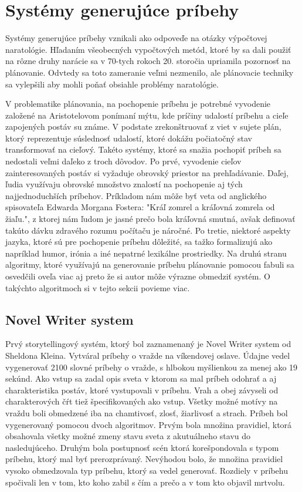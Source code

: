 \section{Systémy generujúce príbehy}
Systémy generujúce príbehy vznikali ako odpoveďe na otázky výpočtovej naratológie. Hľadaním všeobecných vypočtových metód, ktoré by sa dali použiť na rôzne druhy narácie sa v 70-tych rokoch 20. storočia upriamila pozornosť na plánovanie. Odvtedy sa toto zameranie veľmi nezmenilo, ale plánovacie techniky sa vylepšili aby mohli poňať obsiahle problémy naratológie.\par
V problematike plánovania, na pochopenie príbehu je potrebné vyvodenie založené na Aristotelovom ponímaní mýtu, kde príčiny udalostí príbehu a cieľe zapojených postáv su známe. V podstate zrekonštruovať z viet v sujete plán, ktorý reprezentuje súslednosť udalostí, ktoré dokážu počiatočný stav transformovať na cieľový. Takéto systémy, ktoré sa snažia pochopiť príbeh sa nedostali veľmi daľeko z troch dôvodov. Po prvé, vyvodenie cieľov zainteresovaných postáv si vyžaduje obrovský priestor na prehľadávanie. Daľej, ľudia využívaju obrovské množstvo znalostí na pochopenie aj tých najjednoduchších príbehov. Príkladom nám môže byť veta od anglického spisovateľa Edwarda Morgana Fostera: "Kráľ zomrel a kráľovná zomrela od žiaľu.", z ktorej nám ľudom je jasné prečo bola kráľovná smutná, avšak definovať takúto dávku zdravého rozumu počítaču je náročné. Po tretie, niektoré aspekty jazyka, ktoré sú pre pochopenie príbehu dôležité, sa tažko formalizujú ako napríklad humor, irónia a iné nepatrné lexikálne prostriedky. Na druhú stranu algoritmy, ktoré využívajú na generovanie príbehu plánovanie pomocou fabuli sa osvedčili oveľa viac aj preto že si autor môže výrazne obmedziť systém. O takýchto algoritmoch si v tejto sekcii povieme viac.\par
\subsection{Novel Writer system}
Prvý storytellingový systém, ktorý bol zaznamenaný je Novel Writer system\cite{novel_writer} od Sheldona Kleina. Vytváral príbehy o vražde na víkendovej oslave. Údajne vedel vygenerovať 2100 slovné príbehy o vražde, s hlbokou myšlienkou za menej ako 19 sekúnd. Ako vstup sa zadal opis sveta v ktorom sa mal príbeh odohrať a aj charakteristika postáv, ktoré vystupovali v príbehu. Vrah a obej závyseli od charakterových čŕt tiež špecifikovaných ako vstup. Všetky možné motívy na vraždu boli obmedzené iba na chamtivosť, zlosť, žiarlivosť a strach. Príbeh bol vygenerovaný pomocou dvoch algoritmov. Prvým bola množina pravidiel, ktorá obsahovala všetky možné zmeny stavu sveta z akutuálneho stavu do nasledujúceho. Druhým bola postupnosť scén ktorá korešpondovala s typom príbehu, ktorý mal byť prerozprávaný. Nevýhodou bolo, že množina pravidiel vysoko obmedzovala typ príbehu, ktorý sa vedel generovať. Rozdiely v príbehu spočivali len v tom, kto koho zabil s čím a prečo a v tom kto objavil mrtvolu. \par
